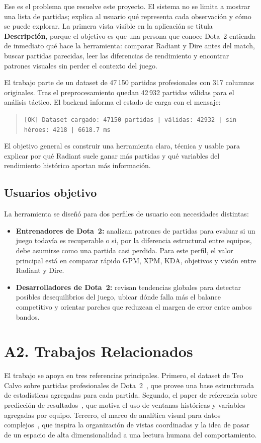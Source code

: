 \documentclass[conference]{IEEEtran}
\begin{document}
Ese es el problema que resuelve este proyecto. El sistema no se limita a
mostrar una lista de partidas; explica al usuario qu\'e representa cada
observaci\'on y c\'omo se puede explorar. La primera vista visible en la
aplicaci\'on se titula \textbf{Descripci\'on}, porque el objetivo es que
una persona que conoce Dota~2 entienda de inmediato qu\'e hace la
herramienta: comparar Radiant y Dire antes del match, buscar partidas
parecidas, leer las diferencias de rendimiento y encontrar patrones
visuales sin perder el contexto del juego.

El trabajo parte de un dataset de 47\,150 partidas profesionales con 317
columnas originales. Tras el preprocesamiento quedan 42\,932 partidas
v\'alidas para el an\'alisis t\'actico. El backend informa el estado de
carga con el mensaje:

\begin{quote}
\texttt{[OK] Dataset cargado: 47150 partidas | v\'alidas: 42932 | sin
h\'eroes: 4218 | 6618.7 ms}
\end{quote}

El objetivo general es construir una herramienta clara, t\'ecnica y
usable para explicar por qu\'e Radiant suele ganar m\'as partidas y qu\'e
variables del rendimiento hist\'orico aportan m\'as informaci\'on.

\subsection{Usuarios objetivo}
La herramienta se dise\~n\'o para dos perfiles de usuario con necesidades
distintas:
\begin{itemize}[leftmargin=*, itemsep=2pt, topsep=3pt]
  \item \textbf{Entrenadores de Dota~2:} analizan patrones de partidas
  para evaluar si un juego todav\'ia es recuperable o si, por la
  diferencia estructural entre equipos, debe asumirse como una partida
  casi perdida. Para este perfil, el valor principal est\'a en comparar
  r\'apido GPM, XPM, KDA, objetivos y visi\'on entre Radiant y Dire.
  \item \textbf{Desarrolladores de Dota~2:} revisan tendencias globales
  para detectar posibles desequilibrios del juego, ubicar d\'onde falla
  m\'as el balance competitivo y orientar parches que reduzcan el margen
  de error entre ambos bandos.
\end{itemize}

\section{A2. Trabajos Relacionados}
El trabajo se apoya en tres referencias principales. Primero, el dataset
de Teo Calvo sobre partidas profesionales de Dota~2~\cite{calvo-dataset},
que provee una base estructurada de estad\'isticas agregadas para cada
partida. Segundo, el paper de referencia sobre predicci\'on de
resultados~\cite{calvo-paper}, que motiva el uso de ventanas
hist\'oricas y variables agregadas por equipo. Tercero, el marco de
anal\'itica visual para datos complejos~\cite{acm}, que inspira la
organización de vistas coordinadas y la idea de pasar de un espacio de
alta dimensionalidad a una lectura humana del comportamiento.
\end{document}
